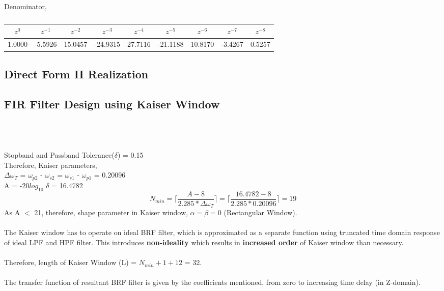 \documentclass[12pt]{article}
\begin{document}
Denominator,

\begin{table}[H]
\centering  %
\begin{tabular}{|c|c|c|c|c|c|c|c|c|}
\hline  %
$z^0$ & $z^{-1}$ & $z^{-2}$ & $z^{-3}$ & $z^{-4}$ & $z^{-5}$ & $z^{-6}$ & $z^{-7}$ & $z^{-8}$ \\ \hline
1.0000  & -5.5926 & 15.0457 & -24.9315 & 27.7116 & -21.1188 & 10.8170 & -3.4267 & 0.5257 \\
\hline    %
\end{tabular}
\caption{}
\end{table}



\subsection{Direct Form II Realization}


\begin{figure}[H]
    \caption{}
\end{figure}


\newpage
\subsection{FIR Filter Design using Kaiser Window}
\\ \\ \\
Stopband and Passband Tolerance($\delta$) = 0.15\\
Therefore, Kaiser parameters,\\
$\Delta\omega_T$ = $\omega_{p2}$ - $\omega_{s2}$ = $\omega_{s1}$ - $\omega_{p1}$ = 0.20096\\
A = -20$log_{10}$ $\delta$ = 16.4782\\
\begin{equation}
    N_{min} = \lceil\frac{A - 8}{2.285*\Delta\omega_T}\rceil = \lceil\frac{16.4782 - 8}{2.285*0.20096}\rceil = 19 
\end{equation}
As A $<$ 21, therefore, shape parameter in Kaiser window, $\alpha = \beta = 0$ (Rectangular Window).\\
\newline
\\
The Kaiser window has to operate on ideal BRF filter, which is approximated as a separate function using truncated time domain response of ideal LPF and HPF filter. This introduces {\bf non-ideality} which results in {\bf increased order} of Kaiser window than necessary.\\ \\
Therefore, length of Kaiser Window (L) = $N_{min} + 1 + 12$ = 32.\\ \\
The transfer function of resultant BRF filter is given by the coefficients mentioned, from zero to increasing time delay (in Z-domain).
\\
\end{document}
